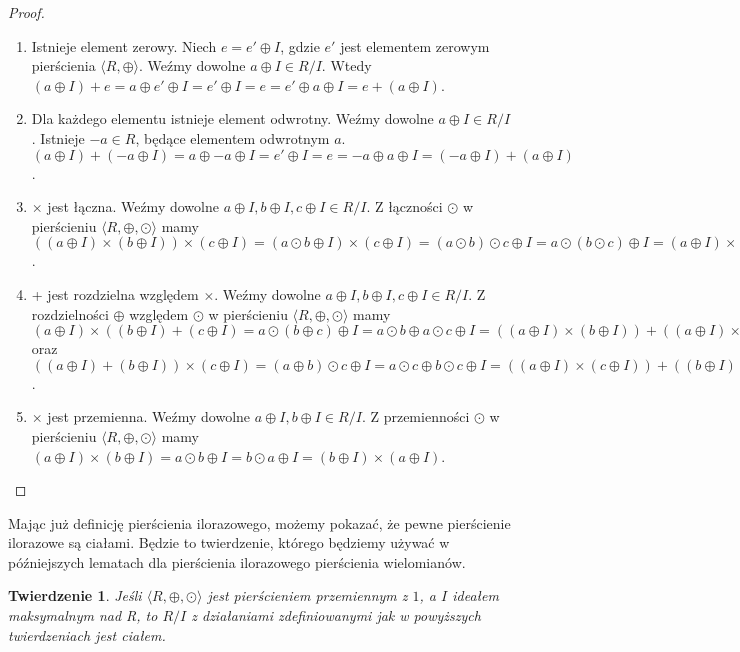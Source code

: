 \documentclass[polish,declaration,shortabstract]{iithesis}
\theoremstyle{definition}
\theoremstyle{remark} \newtheorem{observation}{Obserwacja}
\theoremstyle{plain} \newtheorem{theorem}{Twierdzenie}
\theoremstyle{plain} \newtheorem{lemma}{Lemat}
\theoremstyle{remark} \newtheorem*{remark*}{Uwaga}
\theoremstyle{reminder} \newtheorem*{reminder*}{Przypomnienie}
\begin{document}
\begin{proof}
\begin{enumerate}[resume,label=(\arabic*),leftmargin=.4in]
\begin{enumerate}[label=(3.\arabic*)]
		      	\item Istnieje element zerowy. Niech $e = e' \oplus I$, gdzie $e'$ jest elementem zerowym pierścienia $\langle R, \oplus \rangle$. Weźmy dowolne $a \oplus I \in R/I$. Wtedy $(a \oplus I) + e = a \oplus e' \oplus I = e' \oplus I = e = e' \oplus a \oplus I = e + (a \oplus I)$.
		      	\item Dla każdego elementu istnieje element odwrotny. Weźmy dowolne $a \oplus I \in R/I$. Istnieje $-a \in R$, będące elementem odwrotnym $a$. $(a \oplus I) + (-a \oplus I) = a \oplus -a \oplus I = e' \oplus I = e = -a \oplus a \oplus I = (-a \oplus I) + (a \oplus I)$.
		      	\item $\times$ jest łączna. Weźmy dowolne $a \oplus I, b \oplus I, c \oplus I \in R/I$. Z łączności $\odot$ w pierścieniu $\langle R, \oplus, \odot \rangle$ mamy $((a \oplus I) \times (b \oplus I)) \times (c \oplus I) = (a \odot b \oplus I) \times (c \oplus I) = (a \odot b) \odot c \oplus I = a \odot (b \odot c) \oplus I = (a \oplus I) \times (b \odot c \oplus I) = (a \oplus I) \times ((b \oplus I) \times (c \oplus I))$.
		      	\item + jest rozdzielna względem $\times$. Weźmy dowolne $a \oplus I, b \oplus I, c \oplus I \in R/I$. Z rozdzielności $\oplus$ względem $\odot$ w pierścieniu $\langle R, \oplus, \odot \rangle$ mamy $(a \oplus I) \times ((b \oplus I) + (c \oplus I) = a \odot (b \oplus c) \oplus I = a \odot b \oplus a \odot c \oplus I = ((a \oplus I) \times (b \oplus I)) + ((a \oplus I) \times (c \oplus I)))$ oraz $((a \oplus I) + (b \oplus I)) \times (c \oplus I) = (a \oplus b) \odot c \oplus I = a \odot c \oplus b \odot c \oplus I = ((a \oplus I) \times (c \oplus I)) + ((b \oplus I) \times (c \oplus I))$.
		      	\item $\times$ jest przemienna. Weźmy dowolne $a \oplus I, b \oplus I \in R/I$. Z przemienności $\odot$ w pierścieniu $\langle R, \oplus, \odot \rangle$ mamy $(a \oplus I) \times (b \oplus I) = a \odot b \oplus I = b \odot a \oplus I = (b \oplus I) \times (a \oplus I)$.
		      \end{enumerate}
	\end{enumerate}
\end{proof}

Mając już definicję pierścienia ilorazowego, możemy pokazać, że pewne pierścienie ilorazowe są ciałami. Będzie to twierdzenie, którego będziemy używać w późniejszych lematach dla pierścienia ilorazowego pierścienia wielomianów.

\theoremstyle{theorem}
\begin{theorem}\label{pier_ilo_cialem0}
	Jeśli $\langle R, \oplus, \odot \rangle$ jest pierścieniem przemiennym z $1$, a $I$ ideałem maksymalnym nad R, to $R/I$ z działaniami zdefiniowanymi jak w powyższych twierdzeniach jest ciałem.
\end{theorem}
\end{document}
